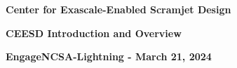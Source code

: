 \documentclass[aspectratio=169]{beamer}
\begin{document}
\begin{frame}\frametitle{}
\vspace*{0.2in}
\centerline{\textrm{{\large\bfseries\color{myOrange}Center for Exascale-Enabled Scramjet Design}}}
\smallskip
\centerline{\textrm{{\small\bfseries\color{myOrange}CEESD Introduction and Overview}}}
\smallskip
\smallskip
\centerline{\textrm{{\large\bfseries{EngageNCSA-Lightning - March 21, 2024}}}}
\vspace*{0.2in}
\begin{center}
\vspace*{0.4in}
\end{center}
\end{frame}
\end{document}
